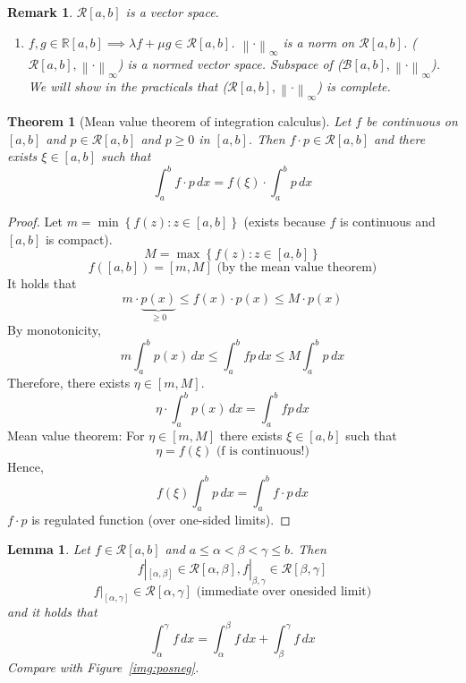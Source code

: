 \documentclass{article}
\newtheorem{theorem}{Theorem}  \numberwithin{theorem}{section}
\newtheorem{lemma}{Lemma}  \numberwithin{lemma}{section}
\newtheorem{remark}{Remark}  \numberwithin{remark}{section}
\newcommand{\set}[1]{\left\{#1\right\}}
\newcommand{\norm}[1]{\left\|#1\right\|}
\begin{document}
\begin{remark}
  $\mathcal R[a,b]$ is a vector space.

  \begin{enumerate}
    \item $f, g \in \mathbb R[a,b] \implies \lambda f + \mu g \in \mathcal R[a,b]$.
      $\norm{\cdot}_{\infty}$ is a norm on $\mathcal R[a,b]$.
      ($\mathcal R[a,b], \norm{\cdot}_{\infty}$) is a normed vector space.
      Subspace of ($\mathcal B[a,b], \norm{\cdot}_{\infty}$).
      We will show in the practicals that ($\mathcal R[a,b], \norm{\cdot}_{\infty}$) is complete.
  \end{enumerate}
\end{remark}

\begin{theorem}[Mean value theorem of integration calculus]
  \label{mvt} \label{satz3}
  Let $f$ be continuous on $[a,b]$ and $p \in \mathcal R[a,b]$
  and $p \geq 0$ in $[a,b]$.
  Then $f \cdot p \in \mathcal R[a,b]$ and there exists $\xi \in [a,b]$ such that
  \[ \int_a^b f \cdot p \, dx = f(\xi) \cdot \int_a^b p \, dx \]
\end{theorem}
\begin{proof}
  Let $m = \min\set{f(z): z \in [a,b]}$ (exists because $f$ is continuous and $[a,b]$ is compact).
  \[ M = \max\set{f(z): z \in [a,b]} \]
  \[ f([a,b]) = [m, M] \text{ (by the mean value theorem)} \]
  It holds that
  \[ m \cdot \underbrace{p(x)}_{\geq 0} \leq f(x) \cdot p(x) \leq M \cdot p(x) \]
  By monotonicity,
  \[ m \int_a^b p(x) \, dx \leq \int_a^b fp \, dx \leq M \int_a^b p \, dx \]
  Therefore, there exists $\eta \in [m, M]$.
  \[ \eta \cdot \int_a^b p(x) \, dx = \int_a^b fp \, dx \]
  Mean value theorem: For $\eta \in [m,M]$ there exists $\xi \in [a,b]$ such that
  \[ \eta = f(\xi) \text{ (f is continuous!)} \]
  Hence,
  \[ f(\xi) \int_a^b p \, dx = \int_a^b f \cdot p \, dx \]
  $f \cdot p$ is regulated function (over one-sided limits).
\end{proof}

\begin{lemma} %
  Let $f \in \mathcal R[a,b]$ and $a \leq \alpha < \beta < \gamma \leq b$.
  Then
  \[ f|_{[\alpha,\beta]} \in \mathcal R[\alpha,\beta], f|_{\beta,\gamma} \in \mathcal R[\beta,\gamma] \]
  \[ f|_{[\alpha,\gamma]} \in \mathcal R[\alpha,\gamma] \text{ (immediate over onesided limit)} \]
  and it holds that
  \[ \int_{\alpha}^\gamma f\, dx = \int_{\alpha}^\beta f \, dx + \int_\beta^\gamma f \, dx \]
  Compare with Figure~\ref{img:posneg}.
\end{lemma}
\end{document}
